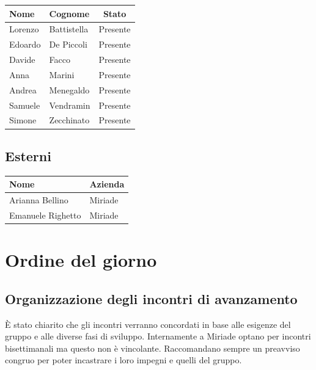 \documentclass[a4paper, 10pt, colorlinks=true, linkcolor=black, urlcolor=blue, citecolor=blue, hidelinks]{article}
\begin{document}
\begin{center}
\begin{tabular}{|l|l|c|}
\hline
\textbf{Nome} & \textbf{Cognome} & \textbf{Stato} \\
\hline
Lorenzo & Battistella & Presente \\
Edoardo & De Piccoli & Presente \\
Davide & Facco & Presente \\
Anna & Marini & Presente \\
Andrea & Menegaldo & Presente \\
Samuele & Vendramin & Presente \\
Simone & Zecchinato & Presente \\
\hline
\end{tabular}
\end{center}

\subsection{Esterni}

\begin{center}
\begin{tabular}{|l|l|}
\hline
\textbf{Nome} & \textbf{Azienda} \\
\hline
Arianna Bellino & Miriade \\
\hline
Emanuele Righetto & Miriade \\
\hline
\end{tabular}
\end{center}

\section{Ordine del giorno}

\subsection{Organizzazione degli incontri di avanzamento}
È stato chiarito che gli incontri verranno concordati in base alle esigenze del gruppo e alle diverse fasi di sviluppo. Internamente a Miriade optano per incontri bisettimanali ma questo non è vincolante. Raccomandano sempre un preavviso congruo per poter incastrare i loro impegni e quelli del gruppo.
\end{document}
